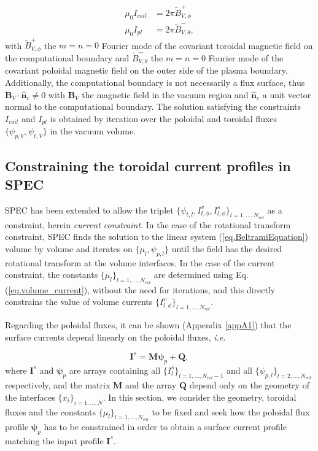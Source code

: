  \begin{align}
 \mu_0 I_{coil} &= 2\pi\tilde{B}^+_{V,\phi}\\
 \mu_0 I_{pl} &= 2\pi\tilde{B}^-_{V,\theta},
 \end{align}
 with $\tilde{B}^+_{V,\phi}$ the $m=n=0$ Fourier mode of the covariant toroidal magnetic field on the computational boundary and $\tilde{B}^-_{V,\theta}$ the $m=n=0$ Fourier mode of the covariant poloidal magnetic field on the outer side of the plasma boundary. Additionally, the computational boundary is not necessarily a flux surface, thus $\mathbf{B}_V\cdot\hat{\mathbf{n}}_c \neq 0$ with $\mathbf{B}_V$ the magnetic field in the vacuum region and $\hat{\mathbf{n}}_c$ a unit vector normal to the computational boundary. The solution satisfying the constraints $I_{coil}$ and $I_{pl}$ is obtained by iteration over the poloidal and toroidal fluxes $\{\psi_{p,V},\psi_{t,V}\}$ in the vacuum volume.
 
 \subsection{Constraining the toroidal current profiles in \ac{SPEC}}
 
\ac{SPEC} has been extended to allow the triplet $\{\psi_{t,l}, I^v_{l,\phi}, I^s_{l,\phi}\}_{l=1,\ldots,N_{vol}}$ as a constraint, herein \textit{current constraint}. In the case of the rotational transform constraint, \ac{SPEC} finds the solution to the linear system (\ref{eq.BeltramiEquation}) volume by volume and iterates on $\{\mu_l, \psi_{p,l}\}$ until the field has the desired rotational transform at the volume interfaces. In the case of the current constraint, the constants $\{\mu_l\}_{l=1,\ldots,N_{vol}}$ are determined using Eq.(\ref{eq.volume_current}), without the need for iterations, and this directly constrains the value of volume currents $\{I^v_{l,\phi}\}_{l=1,\ldots,N_{vol}}$.

Regarding the poloidal fluxes, it can be shown  (Appendix \ref{appA1}) that the surface currents depend linearly on the poloidal fluxes, \textit{i.e.} 

\begin{equation}
\mathbf{I}^s=\mathbf{M}\bm{\psi}_p+\mathbf{Q}\label{eq.complicado},    
\end{equation}
where $\mathbf{I}^s$ and $\bm{\psi}_p$ are arrays containing all $\{I^s_l\}_{l=1,\ldots,N_{vol}-1}$ and all $\{\psi_{p,l}\}_{l=2,\ldots,N_{vol}}$ respectively, and the matrix $\mathbf{M}$ and the  array $\mathbf{Q}$ depend only on the geometry of the interfaces $\{x_i\}_{i=1,\ldots,N}$. In this section, we consider the geometry, toroidal fluxes and the constants $\{\mu_l\}_{l=1,\ldots,N_{vol}}$ to be fixed and seek how the poloidal flux profile $\bm{\psi}_p$ has to be constrained in order to obtain a surface current profile matching the input profile $\mathbf{I}^s$.

